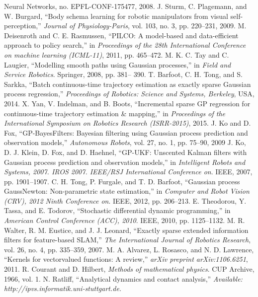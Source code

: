 \documentclass{IEEEtran}
\begin{document}
\begin{thebibliography}{99}
{Neural Networks}, no. EPFL-CONF-175477, 2008.
J. Sturm, C. Plagemann, and W. Burgard, “Body schema learning
for robotic manipulators from visual self-perception,” \emph{Journal of
Physiology-Paris}, vol. 103, no. 3, pp. 220–231, 2009.
M. Deisenroth and C. E. Rasmussen, “PILCO: A model-based and
data-efficient approach to policy search,” in \emph{Proceedings of the 28th
International Conference on machine learning (ICML-11)}, 2011, pp.
465–472.
M. K. C. Tay and C. Laugier, “Modelling smooth paths using Gaussian processes,” in \emph{Field and Service Robotics}. Springer, 2008, pp. 381–
390.
T. Barfoot, C. H. Tong, and S. Sarkka, “Batch continuous-time
trajectory estimation as exactly sparse Gaussian process regression,”
\emph{Proceedings of Robotics: Science and Systems, Berkeley}, USA, 2014.
X. Yan, V. Indelman, and B. Boots, “Incremental sparse GP regression
for continuous-time trajectory estimation \& mapping,” in \emph{Proceedings
of the International Symposium on Robotics Research (ISRR-2015)},
2015.
J. Ko and D. Fox, “GP-BayesFilters: Bayesian filtering using Gaussian
process prediction and observation models,” \emph{Autonomous Robots},
vol. 27, no. 1, pp. 75–90, 2009
J. Ko, D. J. Klein, D. Fox, and D. Haehnel, “GP-UKF: Unscented
Kalman filters with Gaussian process prediction and observation models,” in \emph{Intelligent Robots and Systems, 2007. IROS 2007. IEEE/RSJ
International Conference on}. IEEE, 2007, pp. 1901–1907.
C. H. Tong, P. Furgale, and T. D. Barfoot, “Gaussian process GaussNewton: Non-parametric state estimation,” in \emph{Computer and Robot
Vision (CRV), 2012 Ninth Conference on}. IEEE, 2012, pp. 206–213.
E. Theodorou, Y. Tassa, and E. Todorov, “Stochastic differential dynamic programming,” in \emph{American Control Conference (ACC), 2010}.
IEEE, 2010, pp. 1125–1132.
M. R. Walter, R. M. Eustice, and J. J. Leonard, “Exactly sparse extended information filters for feature-based SLAM,” \emph{The International
Journal of Robotics Research}, vol. 26, no. 4, pp. 335–359, 2007.
M. A. Alvarez, L. Rosasco, and N. D. Lawrence, “Kernels for vectorvalued functions: A review,” \emph{arXiv preprint arXiv:1106.6251}, 2011.
R. Courant and D. Hilbert, \emph{Methods of mathematical physics}. CUP
Archive, 1966, vol. 1.
N. Ratliff, “Analytical dynamics and contact analysis,” \emph{Available:
http://ipvs.informatik.uni-stuttgart.de.}

\end{thebibliography}
\end{document}
